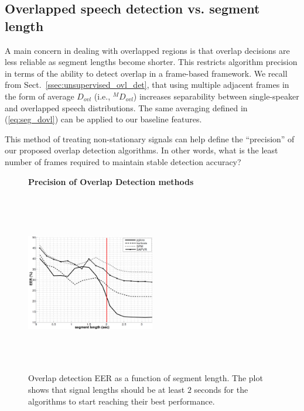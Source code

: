 {%


\newpage
\subsection{Overlapped speech detection vs. segment length}
\label{sssec:ovl_frame_vs_seg}

A main concern in dealing with overlapped regions is that overlap decisions are less reliable as segment lengths become shorter. 
This restricts algorithm precision in terms of the ability to detect overlap in a frame-based framework. 
We recall from Sect.~\ref{ssec:unsupervised_ovl_det}, that using multiple adjacent frames in the form of average $D_{ovl}$ (i.e., $^MD_{ovl}$) increases separability between single-speaker and overlapped speech distributions. 
The same averaging defined in (\ref{eq:seg_dovl}) can be applied to our baseline features. 

This method of treating non-stationary signals can help define the ``precision'' of our proposed overlap detection algorithms. 
In other words, what is the least number of frames required to maintain stable detection accuracy? 

\begin{figure}[h!]
	\centering
	\hspace{-1mm}
	\textbf{Precision of Overlap Detection methods}\par\medskip
	\includegraphics[height = 3.1in, width=0.5\textwidth]{figures/eer_vs_time}
	\vspace{-1mm}
	\caption{Overlap detection EER as a function of segment length. The plot shows that signal lengths should be at least $2$ seconds for the algorithms to start reaching their best performance.}
	\vspace{0mm}
	\label{fig:ovl_det_precision}
\end{figure}


}
